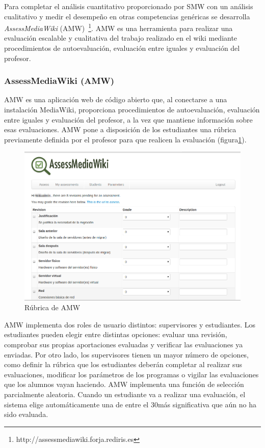	Para completar el análisis cuantitativo proporcionado por SMW con un análisis cualitativo y medir el desempeño en otras competencias genéricas se desarrolla \emph{AssessMediaWiki} (AMW)~\footnote{http://assessmediawiki.forja.rediris.es}. AMW es una herramienta para realizar una evaluación escalable y cualitativa del trabajo realizado en el wiki mediante procedimientos de autoevaluación, evaluación entre iguales y evaluación del profesor.

		\subsubsection{AssessMediaWiki (AMW)}

		AMW es una aplicación web de código abierto que, al conectarse a una instalación MediaWiki, proporciona procedimientos de autoevaluación, evaluación entre iguales y evaluación del profesor, a la vez que mantiene información sobre esas evaluaciones. AMW pone a disposición de los estudiantes una rúbrica previamente definida por el profesor para que realicen la evaluación (figura\ref{fig:AmwRubrica}). 

\begin{figure}
  \begin{center}
    \includegraphics[scale=0.3]{AmwRubrica.png}
  \end{center}
  \caption{Rúbrica de AMW}
  \label{fig:AmwRubrica}
\end{figure}

		AMW implementa dos roles de usuario distintos: supervisores y estudiantes. Los estudiantes pueden elegir entre distintas opciones: evaluar una revisión, comprobar sus propias aportaciones evaluadas y verificar las evaluaciones ya enviadas. Por otro lado, los supervisores tienen un mayor número de opciones, como definir la rúbrica que los estudiantes deberán completar al realizar sus evaluaciones, modificar los parámetros de los programas o vigilar las evaluaciones que los alumnos vayan haciendo. AMW implementa una función de selección parcialmente aleatoria. Cuando un estudiante va a realizar una evaluación, el sistema elige automáticamente una de entre el 30\percentage más significativa que aún no ha sido evaluada.

